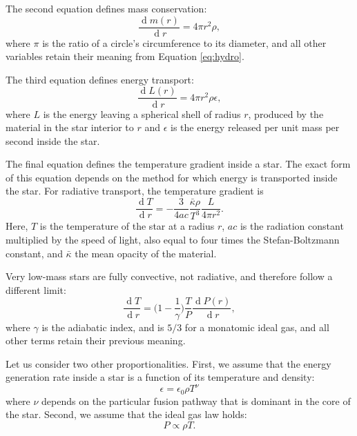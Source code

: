 \documentclass[12pt]{caltech_thesis}
\renewcommand{\d}[1]{\ensuremath{\operatorname{d}\!{#1}}}
\begin{document}
The second equation defines mass conservation:
\begin{equation}
\frac{\d m(r)}{\d r} = 4 \pi r^2 \rho,
\end{equation}
where $\pi$ is the ratio of a circle's circumference to its diameter,
and all other variables retain their meaning from Equation \ref{eq:hydro}.

The third equation defines energy transport:
\begin{equation}
\frac{\d L(r)}{\d r} = 4 \pi r^2 \rho \epsilon,
\end{equation}
where $L$ is the energy leaving a spherical shell of radius $r$, produced by the
material in the star interior to $r$ and $\epsilon$ is the energy released per unit
mass per second inside the star.

The final equation defines the temperature gradient inside a star. 
The exact form of this equation depends on the method for which energy is transported
inside the star.
For radiative transport, the temperature gradient is
\begin{equation}
\frac{\d T}{\d r} = - \frac{3}{4ac} \frac{\bar{\kappa} \rho}{T^3} \frac{L}{4\pi r^2}.
\end{equation}
Here, $T$ is the temperature of the star at a radius $r$, $ac$ is the radiation constant multiplied by the speed of light, also equal to four times the Stefan-Boltzmann
constant, and $\bar{\kappa}$ the mean opacity of the material.

Very low-mass stars are fully convective, not radiative, and therefore follow
a different limit:
\begin{equation}
\frac{\d T}{\d r} =  \bigg( 1 - \frac{1}{\gamma}\bigg)\frac{T}{P}\frac{\d P(r)}{\d r},
\end{equation}
where $\gamma$ is the adiabatic index, and is $5/3$ for a monatomic ideal gas,
and all other terms retain their previous meaning.

Let us consider two other proportionalities. First, we assume that the energy generation rate
inside a star is a function of its temperature and density:
\begin{equation}
\epsilon = \epsilon_0 \rho T^\nu
\end{equation}
where $\nu$ depends on the particular fusion pathway that is dominant in the core of
the star.
Second, we assume that the ideal gas law holds:
\begin{equation}
P \propto \rho T.
\end{equation}
\end{document}
